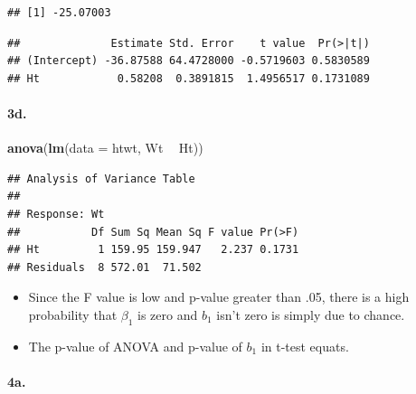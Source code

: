 \documentclass[]{article}
\newenvironment{Shaded}{\begin{snugshade}}{\end{snugshade}}
\newcommand{\KeywordTok}[1]{\textcolor[rgb]{0.13,0.29,0.53}{\textbf{#1}}}
\newcommand{\DataTypeTok}[1]{\textcolor[rgb]{0.13,0.29,0.53}{#1}}
\newcommand{\StringTok}[1]{\textcolor[rgb]{0.31,0.60,0.02}{#1}}
\newcommand{\OperatorTok}[1]{\textcolor[rgb]{0.81,0.36,0.00}{\textbf{#1}}}
\newcommand{\NormalTok}[1]{#1}
\providecommand{\tightlist}{%
  \setlength{\itemsep}{0pt}\setlength{\parskip}{0pt}}
\let\oldparagraph\paragraph
\renewcommand{\paragraph}[1]{\oldparagraph{#1}\mbox{}}
\begin{document}
\begin{verbatim}
## [1] -25.07003
\end{verbatim}

\begin{Shaded}
\end{Shaded}

\begin{verbatim}
##              Estimate Std. Error    t value  Pr(>|t|)
## (Intercept) -36.87588 64.4728000 -0.5719603 0.5830589
## Ht            0.58208  0.3891815  1.4956517 0.1731089
\end{verbatim}

\paragraph{3d.}\label{d.}

\begin{Shaded}
\begin{Highlighting}[]
\KeywordTok{anova}\NormalTok{(}\KeywordTok{lm}\NormalTok{(}\DataTypeTok{data =}\NormalTok{ htwt, Wt }\OperatorTok{~}\StringTok{ }\NormalTok{Ht))}
\end{Highlighting}
\end{Shaded}

\begin{verbatim}
## Analysis of Variance Table
## 
## Response: Wt
##           Df Sum Sq Mean Sq F value Pr(>F)
## Ht         1 159.95 159.947   2.237 0.1731
## Residuals  8 572.01  71.502
\end{verbatim}

\begin{itemize}
\tightlist
\item
  Since the F value is low and p-value greater than .05, there is a high
  probability that \(\beta_{1}\) is zero and \(b_{1}\) isn't zero is
  simply due to chance.
\item
  The p-value of ANOVA and p-value of \(b_{1}\) in t-test equats.
\end{itemize}

\paragraph{\texorpdfstring{4a. }{4a.  }}\label{a.-1}

\begin{Shaded}
\end{Shaded}
\end{document}
